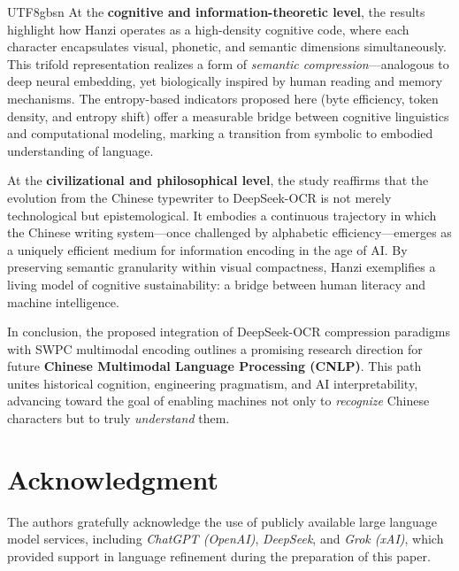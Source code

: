 \documentclass[conference]{IEEEtran}
\begin{document}
\begin{CJK*}{UTF8}{gbsn}
At the \textbf{cognitive and information-theoretic level}, the results highlight how Hanzi operates as a high-density cognitive code, where each character encapsulates visual, phonetic, and semantic dimensions simultaneously. This trifold representation realizes a form of \emph{semantic compression}—analogous to deep neural embedding, yet biologically inspired by human reading and memory mechanisms. The entropy-based indicators proposed here (byte efficiency, token density, and entropy shift) offer a measurable bridge between cognitive linguistics and computational modeling, marking a transition from symbolic to embodied understanding of language.

At the \textbf{civilizational and philosophical level}, the study reaffirms that the evolution from the Chinese typewriter to DeepSeek-OCR is not merely technological but epistemological. It embodies a continuous trajectory in which the Chinese writing system—once challenged by alphabetic efficiency—emerges as a uniquely efficient medium for information encoding in the age of AI. By preserving semantic granularity within visual compactness, Hanzi exemplifies a living model of cognitive sustainability: a bridge between human literacy and machine intelligence.

In conclusion, the proposed integration of DeepSeek-OCR compression paradigms with SWPC multimodal encoding outlines a promising research direction for future \textbf{Chinese Multimodal Language Processing (CNLP)}. This path unites historical cognition, engineering pragmatism, and AI interpretability, advancing toward the goal of enabling machines not only to \textit{recognize} Chinese characters but to truly \textit{understand} them.


\section*{Acknowledgment}

The authors gratefully acknowledge the use of publicly available large language model services, including \textit{ChatGPT (OpenAI)}, \textit{DeepSeek}, and \textit{Grok (xAI)}, which provided support in language refinement during the preparation of this paper.





\end{CJK*}
\end{document}
